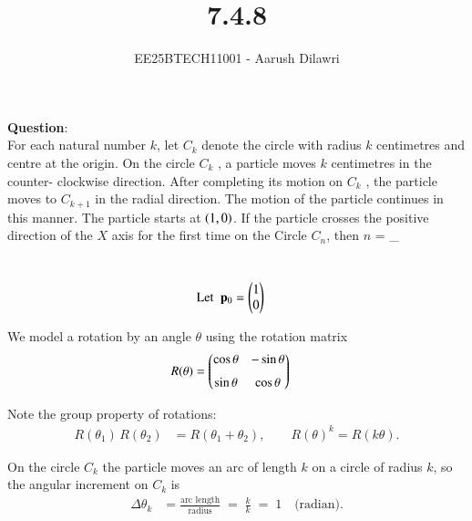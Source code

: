\documentclass[journal]{IEEEtran}
\begin{document}

\vspace{3cm}

\title{7.4.8}
\author{EE25BTECH11001 - Aarush Dilawri}
\maketitle
{\let\newpage\relax\maketitle}

\renewcommand{\thefigure}{\theenumi}
\renewcommand{\thetable}{\theenumi}
\setlength{\intextsep}{10pt} %


\renewcommand{\thetable}{\theenumi}

\textbf{Question}:\\
For each natural number $k$, let $C_k$ denote the circle with radius $k$ centimetres and
centre at the origin. On the circle $C_k$ , a particle moves $k$ centimetres in the counter-
clockwise direction. After completing its motion on $C_k$ , the particle moves to $C_{k+1}$ in the radial direction. The motion of the particle continues in this manner. The particle
starts at $\left(1,0\right)$. If the particle crosses the positive direction of the $X$ axis for the first time on the Circle $C_n$, then $n$ = \_

\solution \\

\begin{align}
    \text{Let }\; \mathbf{p}_0 &= \begin{pmatrix}1 \\ 0\end{pmatrix} 
\end{align}

We model a rotation by an angle $\theta$ using the rotation matrix
\begin{align}
    R(\theta) &= \begin{pmatrix}\cos\theta & -\sin\theta \\[6pt] \sin\theta & \cos\theta\end{pmatrix}
\end{align}

Note the group property of rotations:
\begin{align}
    R(\theta_1)\,R(\theta_2) &= R(\theta_1+\theta_2),
    \qquad R(\theta)^k = R(k\theta).
\end{align}

On the circle $C_k$ the particle moves an arc of length $k$ on a circle of radius $k$, 
so the angular increment on $C_k$ is
\begin{align}
    \Delta\theta_k &= \frac{\text{arc length}}{\text{radius}} \;=\; \frac{k}{k} \;=\; 1 \quad\text{(radian).}
\end{align}
\end{document}

